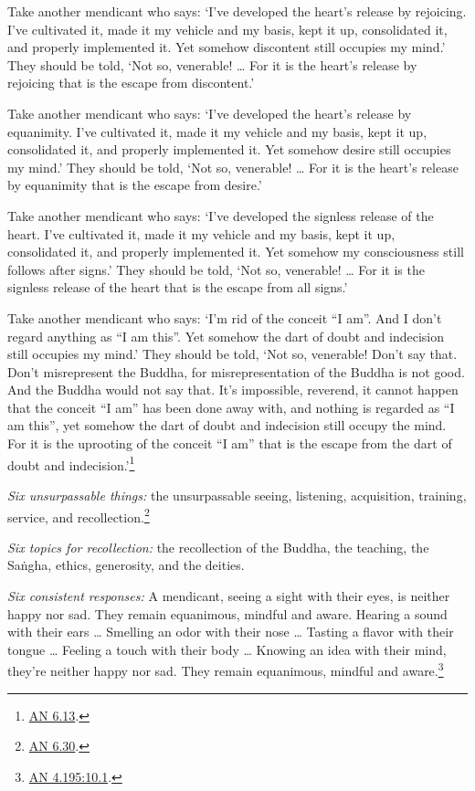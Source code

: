 \documentclass[12pt,openany]{book}%
\begin{document}
Take another mendicant who says: ‘I’ve developed the heart’s release by rejoicing. I’ve cultivated it, made it my vehicle and my basis, kept it up, consolidated it, and properly implemented it. Yet somehow discontent still occupies my mind.’ They should be told, ‘Not so, venerable! … For it is the heart’s release by rejoicing that is the escape from discontent.’ 

Take another mendicant who says: ‘I’ve developed the heart’s release by equanimity. I’ve cultivated it, made it my vehicle and my basis, kept it up, consolidated it, and properly implemented it. Yet somehow desire still occupies my mind.’ They should be told, ‘Not so, venerable! … For it is the heart’s release by equanimity that is the escape from desire.’ 

Take another mendicant who says: ‘I’ve developed the signless release of the heart. I’ve cultivated it, made it my vehicle and my basis, kept it up, consolidated it, and properly implemented it. Yet somehow my consciousness still follows after signs.’ They should be told, ‘Not so, venerable! … For it is the signless release of the heart that is the escape from all signs.’ 

Take another mendicant who says: ‘I’m rid of the conceit “I am”. And I don’t regard anything as “I am this”. Yet somehow the dart of doubt and indecision still occupies my mind.’ They should be told, ‘Not so, venerable! Don’t say that. Don’t misrepresent the Buddha, for misrepresentation of the Buddha is not good. And the Buddha would not say that. It’s impossible, reverend, it cannot happen that the conceit “I am” has been done away with, and nothing is regarded as “I am this”, yet somehow the dart of doubt and indecision still occupy the mind. For it is the uprooting of the conceit “I am” that is the escape from the dart of doubt and indecision.’\footnote{\href{https://suttacentral.net/an6.13/en/sujato}{AN 6.13}. } 

\emph{Six unsurpassable things:} the unsurpassable seeing, listening, acquisition, training, service, and recollection.\footnote{\href{https://suttacentral.net/an6.30/en/sujato}{AN 6.30}. } 

\emph{Six topics for recollection:} the recollection of the Buddha, the teaching, the \textsanskrit{Saṅgha}, ethics, generosity, and the deities. 

\emph{Six consistent responses:} A mendicant, seeing a sight with their eyes, is neither happy nor sad. They remain equanimous, mindful and aware. Hearing a sound with their ears … Smelling an odor with their nose … Tasting a flavor with their tongue … Feeling a touch with their body … Knowing an idea with their mind, they’re neither happy nor sad. They remain equanimous, mindful and aware.\footnote{\href{https://suttacentral.net/an4.195/en/sujato\#10.1}{AN 4.195:10.1}. } 
\end{document}
